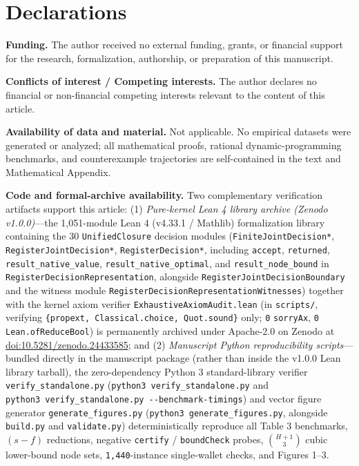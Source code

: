 \documentclass[11pt,a4paper]{article}
\begin{document}
\section*{Declarations}\label{declarations}

\textbf{Funding.} The author received no external funding, grants, or
financial support for the research, formalization, authorship, or
preparation of this manuscript.

\textbf{Conflicts of interest / Competing interests.} The author
declares no financial or non-financial competing interests relevant to
the content of this article.

\textbf{Availability of data and material.} Not applicable. No empirical
datasets were generated or analyzed; all mathematical proofs, rational
dynamic-programming benchmarks, and counterexample trajectories are
self-contained in the text and Mathematical Appendix.

\textbf{Code and formal-archive availability.} Two complementary
verification artifacts support this article: (1) \emph{Pure-kernel Lean
4 library archive (Zenodo v1.0.0)}---the 1,051-module Lean 4 (v4.33.1 /
Mathlib) formalization library containing the 30 \texttt{UnifiedClosure}
decision modules (\texttt{FiniteJointDecision*},
\texttt{RegisterJointDecision*}, \texttt{RegisterDecision*}, including
\texttt{accept}, \texttt{returned}, \texttt{result\_native\_value},
\texttt{result\_native\_optimal}, and \texttt{result\_node\_bound} in
\texttt{RegisterDecisionRepresentation}, alongside
\texttt{RegisterJointDecisionBoundary} and the witness module
\texttt{RegisterDecisionRepresentationWitnesses}) together with the
kernel axiom verifier \texttt{ExhaustiveAxiomAudit.lean} (in
\texttt{scripts/}, verifying
\texttt{\{propext,\ Classical.choice,\ Quot.sound\}} only; \texttt{0}
\texttt{sorryAx}, \texttt{0} \texttt{Lean.ofReduceBool}) is permanently
archived under Apache-2.0 on Zenodo at
\href{https://doi.org/10.5281/zenodo.24433585}{doi:10.5281/zenodo.24433585};
and (2) \emph{Manuscript Python reproducibility scripts}---bundled
directly in the manuscript package (rather than inside the v1.0.0 Lean
library tarball), the zero-dependency Python 3 standard-library verifier
\texttt{verify\_standalone.py} (\texttt{python3\ verify\_standalone.py}
and \texttt{python3\ verify\_standalone.py\ -\/-benchmark-timings}) and
vector figure generator \texttt{generate\_figures.py}
(\texttt{python3\ generate\_figures.py}, alongside \texttt{build.py} and
\texttt{validate.py}) deterministically reproduce all Table 3
benchmarks, \((s - f)\) reductions, negative \texttt{certify} /
\texttt{boundCheck} probes, \(\binom{H+1}{3}\) cubic lower-bound node
sets, \texttt{1,440}-instance single-wallet checks, and Figures 1--3.
\end{document}
